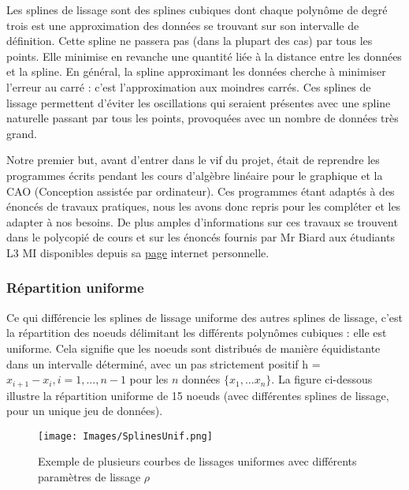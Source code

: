 \documentclass[a4paper,12pt]{article} %
\begin{document}
		    Les splines de lissage sont des splines cubiques dont chaque polynôme de degré trois est une approximation des données se trouvant sur son intervalle de définition. Cette spline ne passera pas (dans la plupart des cas)  par tous les points. Elle  minimise en revanche une quantité liée à la distance entre les données et la spline. En général, la spline approximant les données cherche à minimiser l'erreur au carré : c'est l'approximation aux moindres carrés.  Ces splines de lissage permettent d'éviter les oscillations qui seraient présentes avec une spline naturelle passant par tous les points, provoquées avec un nombre de données très grand. 
		    
		    Notre premier but, avant d'entrer dans le vif du projet, était de reprendre les programmes écrits pendant les cours d'algèbre linéaire pour le graphique et la CAO (Conception assistée par ordinateur). Ces programmes étant adaptés à des énoncés de travaux pratiques, nous les avons donc repris pour les compléter et les adapter à nos besoins.  De plus amples d'informations sur ces travaux se trouvent dans le polycopié de cours et sur les énoncés fournis par Mr Biard aux étudiants L3 MI disponibles depuis sa \href{http://www-ljk.imag.fr/membres/Luc.Biard}{page} internet personnelle.
	        

			\subsubsection{Répartition uniforme}
			
                Ce qui différencie les splines de lissage uniforme des autres splines de lissage, c'est la répartition des noeuds délimitant les différents polynômes cubiques : elle est uniforme. Cela signifie que les noeuds sont distribués de manière équidistante dans un intervalle déterminé, avec un pas strictement positif h = $x_{i+1} - x_i, i = 1,...,n-1$ pour les $n$ données $\{x_1, ... x_{n}\}$. La figure ci-dessous illustre la répartition uniforme de 15 noeuds (avec différentes splines de lissage, pour un unique jeu de données).
                \begin{figure}[H]
                    \centering
                    \texttt{[image: Images/SplinesUnif.png]}
                    \caption{Exemple de plusieurs courbes de lissages uniformes avec différents paramètres de lissage $\rho$  }
                \end{figure}
                
\end{document}
